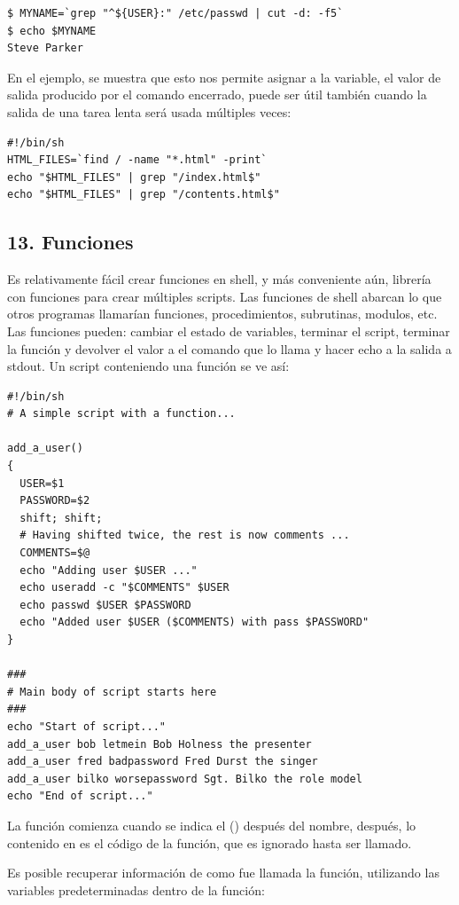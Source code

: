 \documentclass[a4paper]{article}
\begin{document}
\begin{verbatim}
$ MYNAME=`grep "^${USER}:" /etc/passwd | cut -d: -f5`
$ echo $MYNAME
Steve Parker
\end{verbatim}

En el ejemplo, se muestra que esto nos permite asignar a la variable, el valor de salida producido por el comando encerrado, puede ser útil también cuando la salida de una tarea lenta será usada múltiples veces:

\begin{verbatim}
#!/bin/sh
HTML_FILES=`find / -name "*.html" -print`
echo "$HTML_FILES" | grep "/index.html$"
echo "$HTML_FILES" | grep "/contents.html$"
\end{verbatim}

\subsection*{13. Funciones}
Es relativamente fácil crear funciones en shell, y más conveniente aún, librería con funciones para crear múltiples scripts. Las funciones de shell abarcan lo que otros programas llamarían funciones, procedimientos, subrutinas, modulos, etc. Las funciones pueden: cambiar el estado de variables, terminar el script, terminar la función y devolver el valor a el comando que lo llama y hacer echo a la salida a stdout. Un script conteniendo una función se ve así:

\begin{verbatim}
#!/bin/sh
# A simple script with a function...

add_a_user()
{
  USER=$1
  PASSWORD=$2
  shift; shift;
  # Having shifted twice, the rest is now comments ...
  COMMENTS=$@
  echo "Adding user $USER ..."
  echo useradd -c "$COMMENTS" $USER
  echo passwd $USER $PASSWORD
  echo "Added user $USER ($COMMENTS) with pass $PASSWORD"
}

###
# Main body of script starts here
###
echo "Start of script..."
add_a_user bob letmein Bob Holness the presenter
add_a_user fred badpassword Fred Durst the singer
add_a_user bilko worsepassword Sgt. Bilko the role model
echo "End of script..."
\end{verbatim}

La función comienza cuando se indica el () después del nombre, después, lo contenido en {} es el código de la función, que es ignorado hasta ser llamado.

Es posible recuperar información de como fue llamada la función, utilizando las variables predeterminadas dentro de la función:
\end{document}
